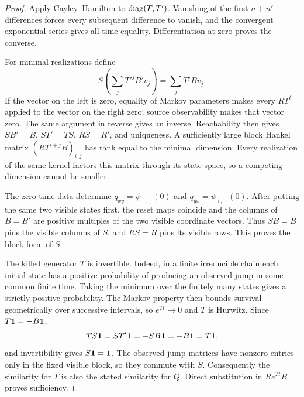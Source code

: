 \begin{proof}
Apply Cayley--Hamilton to $\operatorname{diag}(T,T')$. Vanishing of the first $n+n'$
differences forces every subsequent difference to vanish, and the
convergent exponential series gives all-time equality. Differentiation at
zero proves the converse.

For minimal realizations define
\begin{equation}
 S\left(\sum_jT'^jB'v_j\right)=\sum_jT^jBv_j.
\end{equation}
If the vector on the left is zero, equality of Markov parameters makes
every $RT^\ell$ applied to the vector on the right zero; source
observability makes that vector zero. The same argument in reverse gives
an inverse. Reachability then gives $SB'=B$, $ST'=TS$, $RS=R'$, and
uniqueness. A sufficiently large block Hankel matrix $(RT^{i+j}B)_{i,j}$
has rank equal to the minimal dimension. Every realization of the same
kernel factors this matrix through its state space, so a competing
dimension cannot be smaller.

The zero-time data determine $q_{xy}=\psi_{-,+}(0)$ and
$q_{yx}=\psi_{+,-}(0)$. After putting the same two visible states first,
the reset maps coincide and the columns of $B=B'$ are positive multiples
of the two visible coordinate vectors. Thus $SB=B$ pins the visible
columns of $S$, and $RS=R$ pins its visible rows. This proves the block
form of $S$.

The killed generator $T$ is invertible. Indeed, in a finite irreducible
chain each initial state has a positive probability of producing an
observed jump in some common finite time. Taking the minimum over the
finitely many states gives a strictly positive probability. The Markov
property then bounds survival geometrically over successive intervals,
so $e^{Tt}\to0$ and $T$ is Hurwitz. Since $T\mathbf 1=-B\mathbf 1$,
\begin{equation}
 TS\mathbf 1=ST'\mathbf 1=-SB\mathbf 1=-B\mathbf 1=T\mathbf 1,
\end{equation}
and invertibility gives $S\mathbf 1=\mathbf 1$. The observed jump matrices have nonzero
entries only in the fixed visible block, so they commute with $S$.
Consequently the similarity for $T$ is also the stated similarity for
$Q$. Direct substitution in $Re^{Tt}B$ proves sufficiency.
\end{proof}

